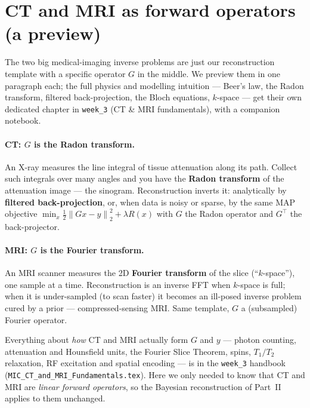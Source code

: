 \documentclass[11pt]{article}
\newcommand{\norm}[1]{\left\lVert #1 \right\rVert}
\begin{document}
\section{CT and MRI as forward operators (a preview)}

The two big medical-imaging inverse problems are just our reconstruction
template with a specific operator $G$ in the middle. We preview them in one
paragraph each; the full physics and modelling intuition --- Beer's law, the
Radon transform, filtered back-projection, the Bloch equations, $k$-space --- get
their own dedicated chapter in \texttt{week\_3} (CT \& MRI fundamentals), with a
companion notebook.

\paragraph{CT: $G$ is the Radon transform.} An X-ray measures the line integral
of tissue attenuation along its path. Collect such integrals over many angles
and you have the \textbf{Radon transform} of the attenuation image --- the
sinogram. Reconstruction inverts it: analytically by \textbf{filtered
back-projection}, or, when data is noisy or sparse, by the same MAP objective
$\min_x \tfrac12\norm{Gx-y}_2^2+\lambda R(x)$ with $G$ the Radon operator and
$G^{\!\top}$ the back-projector.

\paragraph{MRI: $G$ is the Fourier transform.} An MRI scanner measures the 2D
\textbf{Fourier transform} of the slice (``$k$-space''), one sample at a time.
Reconstruction is an inverse FFT when $k$-space is full; when it is
under-sampled (to scan faster) it becomes an ill-posed inverse problem cured by
a prior --- compressed-sensing MRI. Same template, $G$ a (subsampled) Fourier
operator.

\begin{keybox}
Everything about \emph{how} CT and MRI actually form $G$ and $y$ --- photon
counting, attenuation and Hounsfield units, the Fourier Slice Theorem, spins,
$T_1/T_2$ relaxation, RF excitation and spatial encoding --- is in the
\texttt{week\_3} handbook (\texttt{MIC\_CT\_and\_MRI\_Fundamentals.tex}). Here we
only needed to know that CT and MRI are \emph{linear forward operators}, so the
Bayesian reconstruction of Part~II applies to them unchanged.
\end{keybox}
\end{document}
